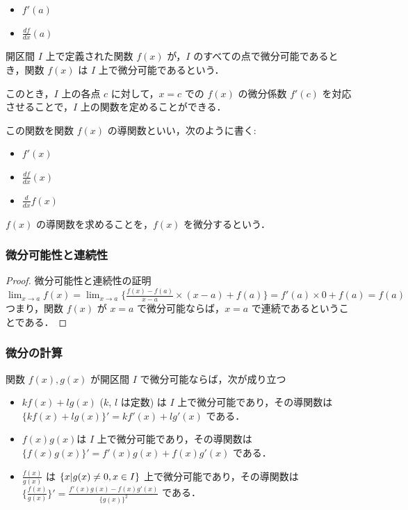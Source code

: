 \documentclass[xelatex,ja=standard,jafont=noto]{bxjsarticle}
\begin{document}
  \begin{itemize}
    \item $f'(a)$
    \item $\frac{df}{dx}(a)$
  \end{itemize}

  開区間 $I$ 上で定義された関数 $f(x)$ が，$I$ のすべての点で微分可能であるとき，関数 $f(x)$ は $I$ 上で微分可能であるという．
  
  このとき，$I$ 上の各点 $c$ に対して，$x = c$ での $f(x)$ の微分係数 $f'(c)$ を対応させることで，$I$ 上の関数を定めることができる．
  
  この関数を関数 $f(x)$ の導関数といい，次のように書く:

  \begin{itemize}
    \item $f'(x)$
    \item $\frac{df}{dx}(x)$
    \item $\frac{d}{dx}f(x)$
  \end{itemize}

  $f(x)$ の導関数を求めることを，$f(x)$ を微分するという．

  \subsubsection{微分可能性と連続性}
  \begin{proof}{微分可能性と連続性の証明}{}
    $\lim_{x \rightarrow a} f(x) = \lim_{x \rightarrow a} \{\frac{f(x) - f(a)}{x - a}\times(x - a)+f(a)\} = f'(a)\times 0 + f(a) = f(a)$
    つまり，関数 $f(x)$ が $x = a$ で微分可能ならば，$x = a$ で連続であるということである．
  \end{proof}

  \subsubsection{微分の計算}
  \begin{theorem}{}{}
    関数 $f(x), g(x)$ が開区間 $I$ で微分可能ならば，次が成り立つ
    \begin{itemize}
      \item $kf(x) + lg(x)$ ($k$, $l$ は定数) は $I$ 上で微分可能であり，その導関数は $\{kf(x) + lg(x)\}' = kf'(x) + lg'(x)$ である． 
      \item $f(x)g(x)$は $I$ 上で微分可能であり，その導関数は $\{f(x)g(x)\}' = f'(x)g(x) + f(x)g'(x)$ である． 
      \item $\frac{f(x)}{g(x)}$ は $\{x | g(x) \neq 0, x \in I\}$ 上で微分可能であり，その導関数は $\{\frac{f(x)}{g(x)}\}' = \frac{f'(x)g(x) - f(x)g'(x)}{\{g(x)\}^2}$ である．
    \end{itemize}
  \end{theorem}
\end{document}
